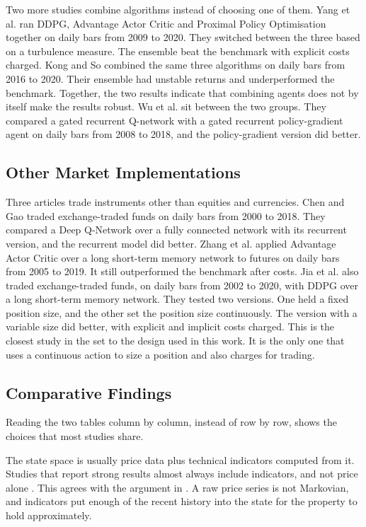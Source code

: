 Two more studies combine algorithms instead of choosing one of them. Yang et al. \cite{yang_deep_2020} ran DDPG, Advantage Actor Critic and Proximal Policy Optimisation together on daily bars from 2009 to 2020. They switched between the three based on a turbulence measure. The ensemble beat the benchmark with explicit costs charged. Kong and So \cite{kong_empirical_2023} combined the same three algorithms on daily bars from 2016 to 2020. Their ensemble had unstable returns and underperformed the benchmark. Together, the two results indicate that combining agents does not by itself make the results robust. Wu et al. \cite{wu_adaptive_2020} sit between the two groups. They compared a gated recurrent Q-network with a gated recurrent policy-gradient agent on daily bars from 2008 to 2018, and the policy-gradient version did better.

\subsection{Other Market Implementations}

Three articles trade instruments other than equities and currencies. Chen and Gao \cite{chen_application_2019} traded exchange-traded funds on daily bars from 2000 to 2018. They compared a Deep Q-Network over a fully connected network with its recurrent version, and the recurrent model did better. Zhang et al. \cite{zhang_deep_2020} applied Advantage Actor Critic over a long short-term memory network to futures on daily bars from 2005 to 2019. It still outperformed the benchmark after costs. Jia et al. \cite{jia_lstm-ddpg_2021} also traded exchange-traded funds, on daily bars from 2002 to 2020, with DDPG over a long short-term memory network. They tested two versions. One held a fixed position size, and the other set the position size continuously. The version with a variable size did better, with explicit and implicit costs charged. This is the closest study in the set to the design used in this work. It is the only one that uses a continuous action to size a position and also charges for trading.

\subsection{Comparative Findings}

Reading the two tables column by column, instead of row by row, shows the choices that most studies share.

The state space is usually price data plus technical indicators computed from it. Studies that report strong results almost always include indicators, and not price alone \cite{carapuco_reinforcement_2018, huang_financial_2018, yang_deep_2020}. This agrees with the argument in . A raw price series is not Markovian, and indicators put enough of the recent history into the state for the property to hold approximately.

